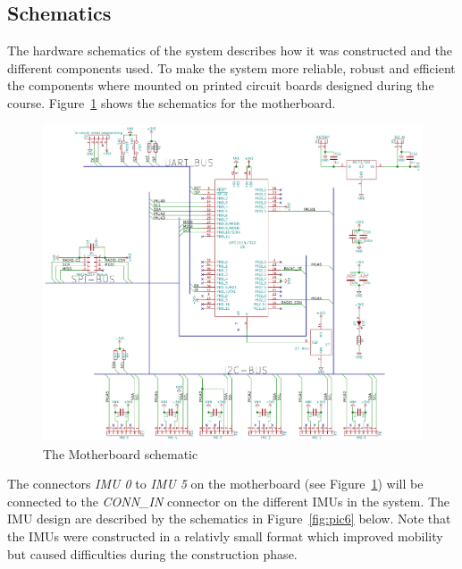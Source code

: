 \documentclass[a4paper, 12pt]{article}
\begin{document}
\subsection*{Schematics} %
The hardware schematics of the system describes how it was constructed and the different components used. To make the system more reliable, robust and efficient the components where mounted on printed circuit boards designed during the course. Figure~\ref{fig:pic5} shows the schematics for the motherboard.
 

\begin{figure}[h!] %
    \centering
    \includegraphics[scale=0.67]{mb_schematic.pdf}
    \caption{The Motherboard schematic}
    \label{fig:pic5}
\end{figure}

\noindent %
The connectors \textit{IMU 0} to \textit{IMU 5} on the motherboard (see Figure~\ref{fig:pic5}) will be connected to the \textit{CONN\_IN} connector on the different IMUs in the system. The IMU design are described by the schematics in Figure~\ref{fig:pic6} below. Note that the IMUs were constructed in a relativly small format which improved mobility but caused difficulties during the construction phase. %
 
\end{document}
